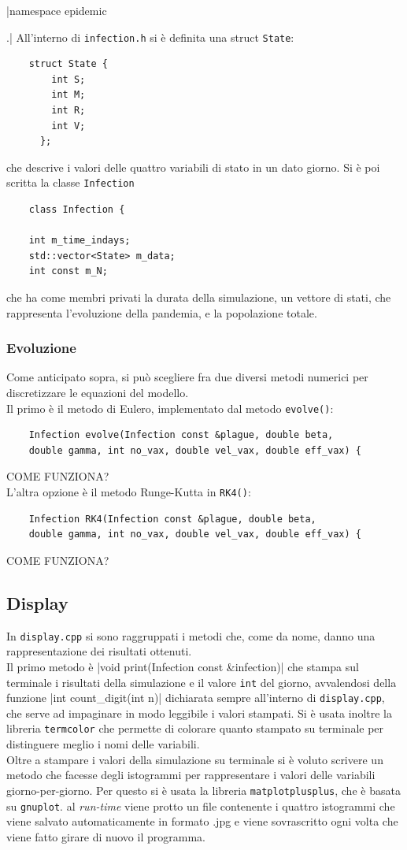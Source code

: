 \documentclass{article}
\begin{document}
|namespace epidemic{.|
All'interno di \verb|infection.h| si è definita una struct 
\verb|State|: 
\begin{verbatim}
    struct State {
        int S; 
        int M; 
        int R; 
        int V; 
      };
\end{verbatim}
che descrive i valori delle quattro variabili di stato in un dato giorno.
Si è poi scritta la classe \verb|Infection|
\begin{verbatim}
    class Infection {

    int m_time_indays; 
    std::vector<State> m_data; 
    int const m_N; 
\end{verbatim}    
che ha come membri privati la durata della simulazione, un vettore di 
stati, che rappresenta l'evoluzione della pandemia, e la popolazione 
totale.
\subsubsection{Evoluzione}
Come anticipato sopra, si può scegliere fra due diversi metodi 
numerici per discretizzare le equazioni del modello.\\
Il primo è il metodo di Eulero, implementato dal metodo 
\verb|evolve()|:
\begin{verbatim}
    Infection evolve(Infection const &plague, double beta, 
    double gamma, int no_vax, double vel_vax, double eff_vax) {
\end{verbatim}
COME FUNZIONA?\\
L'altra opzione è il metodo Runge-Kutta in \verb|RK4()|:
\begin{verbatim}
    Infection RK4(Infection const &plague, double beta, 
    double gamma, int no_vax, double vel_vax, double eff_vax) {
\end{verbatim}
COME FUNZIONA?
\subsection{Display}
In \verb|display.cpp| si sono raggruppati i metodi che, come da 
nome, danno una rappresentazione dei risultati ottenuti.\\
Il primo metodo è 
|void print(Infection const &infection){|
che stampa sul terminale i risultati della simulazione e il valore 
\verb|int| del giorno, avvalendosi della funzione 
|int count_digit(int n){|
dichiarata sempre all'interno di \verb|display.cpp|, che serve ad 
impaginare in modo leggibile i valori stampati.
Si è usata inoltre la libreria \verb|termcolor| che permette di 
colorare quanto stampato su terminale per distinguere meglio
i nomi delle variabili. \\
Oltre a stampare i valori della simulazione su terminale si è voluto
scrivere un metodo che facesse degli istogrammi per rappresentare i
valori delle variabili giorno-per-giorno.
Per questo si è usata la libreria \verb|matplotplusplus|, che è 
basata su \verb|gnuplot|. al \textit{run-time} viene protto un 
file contenente i quattro istogrammi che viene salvato 
automaticamente in formato .jpg e viene sovrascritto ogni volta che
viene fatto girare di nuovo il programma.
}}}
\end{document}
